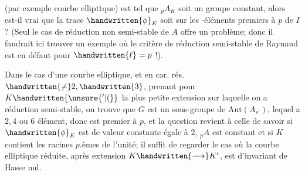 (par exemple courbe ellipttque) est tel que $ {}_p A_K$ soit un groupe constant, alors est-il vrai que la trace $\handwritten{\phi}_E$ soit  sur les -éléments premiers à $p$ de $I$ ? (Seul le cas de réduction non semi-stable de $A$ offre un problème; donc il faudrait ici trouver un exemple où le critère de réduction semi-stable de Raynaud est en défaut pour $\handwritten{\ell}=p$ !).

Dans le cas d'une courbe elliptique, et en car. rés. $\handwritten{\ne}2,\handwritten{3}$, prenant pour $K\handwritten{\unsure{'|(}}$ la plus petite extension sur laquelle on a réduction semi-stable, on trouve que $G$ est un sous-groupe de $\mathrm{Aut}(A_{s'})$, lequel  a\handwritten{(}$2,4$ ou $6$ élément, donc est premier à $p$, et la question revient à celle de savoir si $\handwritten{\phi}_E$ est de valeur constante égale à $2$,  $ {}_p A$ est constant \handwritten{(}et si $K$ contient les racines $p$.èmes de l'unité; il suffit de regarder le cas où la courbe elliptique réduite, après extension $K\handwritten{\longrightarrow}K'$, est d'invariant de Hasse nul\handwritten{)}\deleted{\unsure{;}}.


